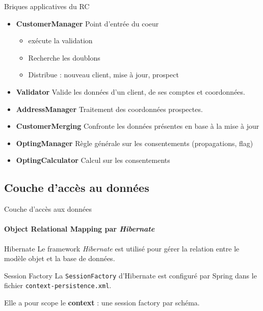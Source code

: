 \documentclass[compact]{beamer}%
\begin{document}
\begin{frame}{Briques applicatives du RC}

	\begin{itemize}
	\item \textbf{CustomerManager} Point d'entrée du coeur
		\begin{itemize}
		\item exécute la validation
		\item Recherche les doublons
		\item Distribue : nouveau client, mise à jour, prospect
		\end{itemize}
	\item \textbf{Validator} Valide les données d'un client, de ses comptes et coordonnées.
	\item \textbf{AddressManager} Traitement des coordonnées prospectes.
	\item \textbf{CustomerMerging} Confronte les données présentes en base à la mise à jour
	\item \textbf{OptingManager} Règle générale sur les consentements (propagations, flag)
	\item \textbf{OptingCalculator} Calcul sur les consentements
	\end{itemize}
	
\end{frame}

\subsection{Couche d'accès au données}

\begin{frame}{Couche d'accès aux données}
	\framesubtitle{Object Relational Mapping par \emph{Hibernate}}
	
	\begin{block}{Hibernate}
	Le framework \emph{Hibernate} est utilisé pour gérer la relation entre le modèle objet et la base de données.
	\end{block}
	
	\pause
	\begin{block}{Session Factory}
	La \texttt{SessionFactory} d'Hibernate est configuré par Spring dans le fichier \texttt{context-persistence.xml}.\par
	Elle a pour scope le \textbf{context} : une session factory par schéma.	
	\end{block}

\end{frame}
\end{document}

